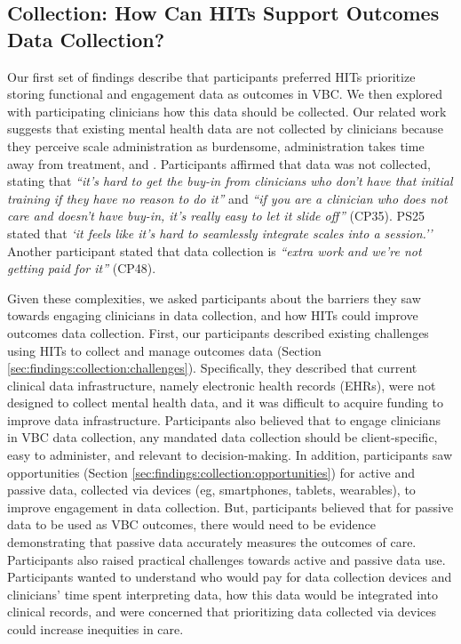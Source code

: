 \subsection{Collection: How Can HITs Support Outcomes Data Collection?}
\label{sec:findings:collection}

Our first set of findings describe that participants preferred HITs prioritize storing functional and engagement data as outcomes in VBC.
We then explored with participating clinicians how this data should be collected.
Our related work suggests that existing mental health data are not collected by clinicians because they perceive scale administration as burdensome, administration takes time away from treatment, and .
Participants affirmed that data was not collected, stating that \textit{``it's hard to get the buy-in from clinicians who don't have that initial training if they have no reason to do it''} and \textit{``if you are a clinician who does not care and doesn't have buy-in, it's really easy to let it slide off''} (CP35).
PS25 stated that \textit{`it feels like it's hard to seamlessly integrate scales into a session.''}
Another participant stated that data collection is \textit{``extra work and we're not getting paid for it''} (CP48).

Given these complexities, we asked participants about the barriers they saw towards engaging clinicians in data collection, and how HITs could improve outcomes data collection.
First, our participants described existing challenges using HITs to collect and manage outcomes data (Section \ref{sec:findings:collection:challenges}).
Specifically, they described that current clinical data infrastructure, namely electronic health records (EHRs), were not designed to collect mental health data, and it was difficult to acquire funding to improve data infrastructure.
Participants also believed that to engage clinicians in VBC data collection, any mandated data collection should be client-specific, easy to administer, and relevant to decision-making.
In addition, participants saw opportunities (Section \ref{sec:findings:collection:opportunities}) for active and passive data, collected via devices (eg, smartphones, tablets, wearables), to improve engagement in data collection.
But, participants believed that for passive data to be used as VBC outcomes, there would need to be evidence demonstrating that passive data accurately measures the outcomes of care.
Participants also raised practical challenges towards active and passive data use.
Participants wanted to understand who would pay for data collection devices and clinicians' time spent interpreting data, how this data would be integrated into clinical records, and were concerned that prioritizing data collected via devices could increase inequities in care. 

